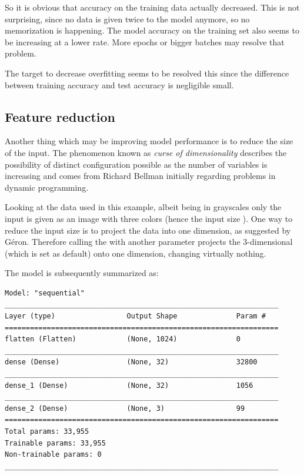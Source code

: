 So it is obvious that accuracy on the training data actually decreased.
This is not surprising, since no data is given twice to the model anymore, so no memorization is happening.
The model accuracy on the training set also seems to be increasing at a lower rate.
More epochs or bigger batches may resolve that problem.

The target to decrease overfitting seems to be resolved this since the difference between training accuracy and test accuracy is negligible small.

\subsection{Feature reduction}

Another thing which may be improving model performance is to reduce the size of the input.
The phenomenon known as \textit{curse of dimensionality} describes the possibility of distinct configuration possible as the number of variables is increasing and comes from Richard Bellman initially regarding problems in dynamic programming\cite[p.ix]{Bellman1957}.

Looking at the data used in this example, albeit being in grayscales only the input is given as an image with three colors (hence the input size \code{[32, 32, 3]}).
One way to reduce the input size is to project the data into one dimension, as suggested by Géron\cite[p.215]{Geron2019}.
Therefore calling the  with another parameter  projects the 3-dimensional  (which is set as default) onto one dimension, changing virtually nothing.

The model is subsequently summarized as:
\begin{lstlisting}
Model: "sequential"
_________________________________________________________________
Layer (type)                 Output Shape              Param #   
=================================================================
flatten (Flatten)            (None, 1024)              0         
_________________________________________________________________
dense (Dense)                (None, 32)                32800     
_________________________________________________________________
dense_1 (Dense)              (None, 32)                1056      
_________________________________________________________________
dense_2 (Dense)              (None, 3)                 99        
=================================================================
Total params: 33,955
Trainable params: 33,955
Non-trainable params: 0
_________________________________________________________________
\end{lstlisting}

